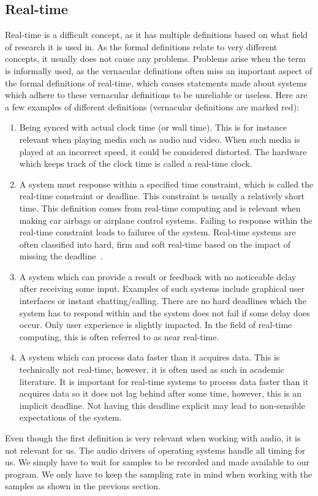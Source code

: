 \documentclass[a4paper,10pt,twocolumn]{article}
\begin{document}
\subsection{Real-time}
Real-time is a difficult concept, as it has multiple definitions based on what field of research it is used in. As the formal definitions relate to very different concepts, it usually does not cause any problems. Problems arise when the term is informally used, as the vernacular definitions often miss an important aspect of the formal definitions of real-time, which causes statements made about systems which adhere to these vernacular definitions to be unreliable or useless. Here are a few examples of different definitions (vernacular definitions are marked red):
\begin{enumerate}
    \item Being synced with actual clock time (or wall time). This is for instance relevant when playing media such as audio and video. When such media is played at an incorrect speed, it could be considered distorted. The hardware which keeps track of the clock time is called a real-time clock.
    \item A system must response within a specified time constraint, which is called the real-time constraint or deadline. This constraint is usually a relatively short time. This definition comes from real-time computing and is relevant when making car airbags or airplane control systems. Failing to response within the real-time constraint leads to failures of the system. Real-time systems are often classified into hard, firm and soft real-time based on the impact of missing the deadline~\cite{realclass}. 
    \color{red}\item\color{black} A system which can provide a result or feedback with no noticeable delay after receiving some input. Examples of such systems include graphical user interfaces or instant chatting/calling. There are no hard deadlines which the system has to respond within and the system does not fail if some delay does occur. Only user experience is slightly impacted. In the field of real-time computing, this is often referred to as near real-time.
    \color{red}\item\color{black} A system which can process data faster than it acquires data. This is technically not real-time, however, it is often used as such in academic literature. It is important for real-time systems to process data faster than it acquires data so it does not lag behind after some time, however, this is an implicit deadline. Not having this deadline explicit may lead to non-sensible expectations of the system.
\end{enumerate}
Even though the first definition is very relevant when working with audio, it is not relevant for us. The audio drivers of operating systems handle all timing for us. We simply have to wait for samples to be recorded and made available to our program. We only have to keep the sampling rate in mind when working with the samples as shown in the previous section.
\end{document}
